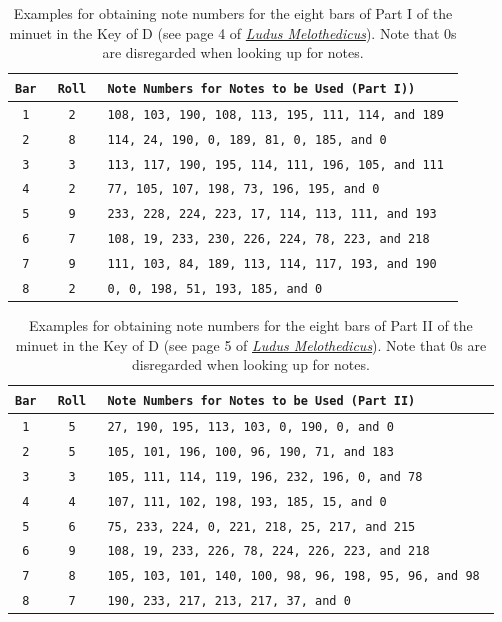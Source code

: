 \documentclass[a4paper,x11names,svgnames,10pt]{article}
\begin{document}
{\begin{table}[H]
	\centering
	\begin{tabular}{|c|c|l|} \hline
		\tt Bar & \tt Roll & \tt Note Numbers for Notes to be Used (Part I))\\ \hline\hline
		\tt 1 & \tt 2 & \tt 108, 103, 190, 108, 113, 195, 111, 114, and 189 \\ \hline
		\tt 2 & \tt 8 & \tt 114, 24, 190, 0, 189, 81, 0, 185,  and 0 \\ \hline
		\tt 3 & \tt 3 & \tt 113, 117, 190, 195, 114, 111, 196, 105, and 111 \\ \hline
		\tt 4 & \tt 2 & \tt 77, 105, 107, 198, 73, 196, 195, and 0  \\ \hline
		\tt 5 & \tt 9 & \tt 233, 228, 224, 223, 17, 114, 113, 111, and 193 \\ \hline
		\tt 6 & \tt 7 & \tt 108, 19, 233, 230, 226, 224, 78, 223, and 218 \\ \hline
		\tt 7 & \tt 9 & \tt 111, 103, 84, 189, 113, 114, 117, 193, and 190 \\ \hline 
		\tt 8 & \tt 2 & \tt 0, 0, 198, 51, 193, 185, and 0 \\ \hline\hline
	\end{tabular}
	\caption{Examples for obtaining note numbers for the eight bars of Part I of the minuet in the Key of D (see page 4 of \href{https://imslp.org/wiki/Ludus_Melothedicus_(Anonymous)}{{\em Ludus Melothedicus}}). Note that 0s are disregarded when looking up for notes.}
	\label{tab:ex1}
\end{table}

\begin{table}[H]
	\centering
	\begin{tabular}{|c|c|l|} \hline
		\tt Bar & \tt Roll & \tt Note Numbers for Notes to be Used (Part II)\\ \hline\hline
		\tt 1 & \tt 5 & \tt 27, 190, 195, 113, 103, 0, 190, 0, and 0 \\ \hline
		\tt 2 & \tt 5 & \tt 105, 101, 196, 100, 96, 190, 71, and 183  \\ \hline
		\tt 3 & \tt 3 & \tt 105, 111, 114, 119, 196, 232, 196, 0, and 78 \\ \hline
		\tt 4 & \tt 4 & \tt 107, 111, 102, 198, 193, 185, 15, and 0  \\ \hline
		\tt 5 & \tt 6 & \tt 75, 233, 224, 0, 221, 218, 25, 217, and 215 \\ \hline
		\tt 6 & \tt 9 & \tt 108, 19, 233, 226, 78, 224, 226, 223, and 218 \\ \hline
		\tt 7 & \tt 8 & \tt 105, 103, 101, 140, 100, 98, 96, 198, 95, 96, and 98 \\ \hline 
		\tt 8 & \tt 7 & \tt 190, 233, 217, 213, 217, 37, and 0 \\ \hline\hline
	\end{tabular}
	\caption{Examples for obtaining note numbers for the eight bars of Part II of the minuet in the Key of D (see page 5 of \href{https://imslp.org/wiki/Ludus_Melothedicus_(Anonymous)}{{\em Ludus Melothedicus}}). Note that 0s are disregarded when looking up for notes.}
	\label{tab:ex2}
\end{table}

}
\end{document}
